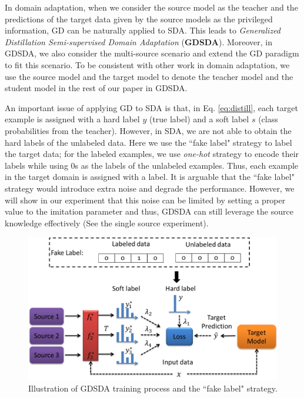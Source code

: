 In domain adaptation, when we consider the source model as the teacher and the predictions of the target data given by the source models as the privileged information,
GD can be naturally applied to SDA. This leads to \textit{Generalized Distillation Semi-supervised Domain Adaptation} (\textbf{GDSDA}). Moreover, in GDSDA, we also consider the multi-source scenario and extend the GD paradigm to fit this scenario. To be consistent with other work in domain adaptation, we use the source model and the target model to denote the teacher model and the student model in the rest of our paper in GDSDA.

An important issue of applying GD to SDA is that, in Eq. \eqref{eq:distill}, each target example is assigned with a hard label $y$ (true label) and a soft label $s$ (class probabilities from the teacher). However, in SDA, we are not able to obtain the hard labels of the unlabeled data. Here we use the ``fake label" strategy to label the target data; for the labeled examples, we use \textit{one-hot} strategy to encode their labels while using 0s as the labels of the unlabeled examples. Thus, each example in the target domain is assigned with a label. It is arguable that the ``fake label" strategy would introduce extra noise and degrade the performance. However, we will show in our experiment that this noise can be limited by setting a proper value to the imitation parameter and thus, GDSDA can still leverage the source knowledge effectively (See the single source experiment).
\begin{figure}
	\centering
	\includegraphics[scale=.4]{figure/multi-GDDA.png}
	\caption{Illustration of GDSDA training process and the ``fake label" strategy.}
	\label{fig:GDSDA}
\end{figure}
 
